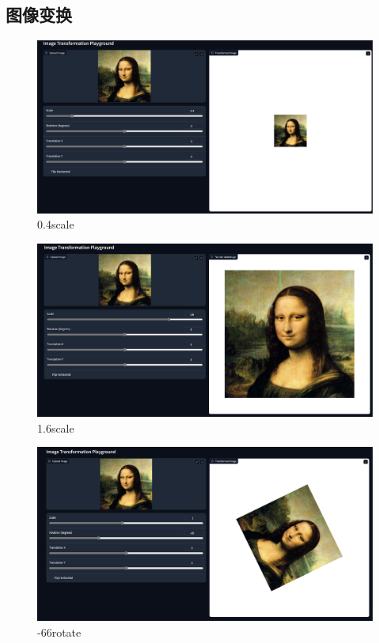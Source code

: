 \documentclass{article}
\begin{document}
	\subsection{图像变换}
\begin{figure}[H]
	\centering
	\includegraphics[scale=0.4]{result/global/scale0_4}
	\caption{0.4scale}
	\label{fig:scale0_4}
\end{figure}
\begin{figure}[H]
	\centering
	\includegraphics[scale=0.4]{result/global/scale1_6}
	\caption{1.6scale}
	\label{fig:scale1_6}
	\end{figure}
\begin{figure}[H]
	\centering
	\includegraphics[scale=0.4]{result/global/rotate__66}
	\caption{-66rotate}
	\label{fig:rotate66}
\end{figure}
\end{document}
